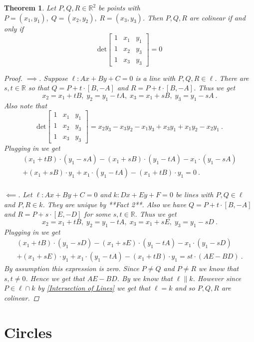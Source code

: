 \documentclass[a4paper,12pt]{report}
\newtheorem{theorem}{Theorem}
\begin{document}
\begin{theorem}\label{Condition for Colinearity}
  Let $P,Q,R\in\mathbb{R}^2$ be points with $P=(x_1,y_1),\; Q=(x_2,y_2),\; R=(x_3,y_3)$. Then $P,Q,R$ are colinear if and only if 
  \[
    \text{det}\begin{bmatrix}
    1 & x_1  & y_1 \\
    1 & x_2  & y_3
    \\
    1 & x_3 & y_3
    \end{bmatrix}=0
  \]
\begin{proof}
  $\implies$. Suppose $\ell:Ax+By+C=0$ is a line with $P,Q,R\in\ell$. There are $s,t\in\mathbb{R}$ so that $Q=P+t\cdot [B,-A]$ and $R=P+t\cdot[B,-A]$. Thus we get 
  \[
      x_2=x_1+tB, \; y_2=y_1-tA, \; x_3=x_1+sB, \; y_3=y_1-sA ~.
  \]
  Also note that 
  \[
    \text{det}\begin{bmatrix}
    1 & x_1  & y_1 \\
    1 & x_2  & y_3
    \\
    1 & x_3 & y_3
    \end{bmatrix}=x_2y_3-x_3y_2-x_1y_3+x_3y_1+x_1y_2-x_2y_1 ~.
  \]
  Plugging in we get
  \begin{align*}
    (x_1+tB)\cdot(y_1-sA)-(x_1+sB)\cdot (y_1-tA)-x_1\cdot(y_1-sA) \\
    +(x_1+sB)\cdot y_1+x_1\cdot (y_1-tA)-(x_1+tB)\cdot y_1=0 ~.
  \end{align*}
  \\
  $\impliedby$. Let $\ell:Ax+By+C=0$ and $k:Dx+Ey+F=0$ be lines with $P,Q\in\ell$ and $P,R\in k$. They are unique by **Fact 2**. Also we have $Q=P+t\cdot [B,-A]$ and $R=P+s\cdot [E,-D]$ for some $s,t\in\mathbb{R}$. Thus we get
  \[
    x_2=x_1+tB, \; y_2=y_1-tA, \; x_3=x_1+sE, \; y_3=y_1-sD ~.
  \]
  Plugging in we get
  \begin{align*}
    (x_1+tB)\cdot(y_1-sD)-(x_1+sE)\cdot (y_1-tA)-x_1\cdot(y_1-sD) \\
    +(x_1+sE)\cdot y_1+x_1\cdot (y_1-tA)-(x_1+tB)\cdot y_1=st\cdot (AE-BD) ~.
  \end{align*}
  By assumption this expression is zero. Since $P\ne Q$ and $P\ne R$ we know that $s,t\ne 0$. Hence we get that $AE-BD$. By  we know that $\ell\parallel k$. However since $P\in \ell \cap k$ by \cref{Intersection of Lines} we get that $\ell=k$ and so $P,Q,R$ are colinear.
\end{proof}
\end{theorem}

\chapter{Circles}
\end{document}
